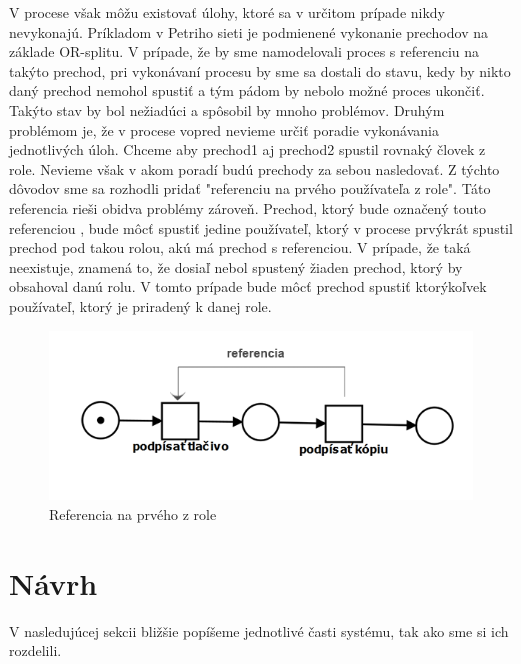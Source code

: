 V procese však môžu existovať úlohy, ktoré sa v určitom prípade nikdy nevykonajú. Príkladom v Petriho sieti je podmienené vykonanie prechodov na základe OR-splitu. V prípade, že by sme namodelovali proces s referenciu na takýto prechod, pri vykonávaní procesu by sme sa dostali do stavu, kedy by nikto daný prechod nemohol spustiť a tým pádom by nebolo možné proces ukončiť. Takýto stav by bol nežiadúci a spôsobil by mnoho problémov. Druhým problémom je, že v procese vopred nevieme určiť poradie vykonávania jednotlivých úloh. Chceme aby prechod1 aj prechod2 spustil rovnaký človek z role. Nevieme však v akom poradí budú prechody za sebou nasledovať. Z týchto dôvodov sme sa rozhodli pridať "referenciu na prvého používateľa z role". Táto referencia rieši obidva problémy zároveň. Prechod, ktorý bude označený touto referenciou , bude môcť spustiť jedine používateľ, ktorý v procese prvýkrát spustil prechod pod takou rolou, akú má prechod s referenciou. V prípade, že taká neexistuje, znamená to, že dosiaľ nebol spustený žiaden prechod, ktorý by obsahoval danú rolu. V tomto prípade bude môcť prechod spustiť ktorýkoľvek používateľ, ktorý je priradený k danej role.

\begin{figure}[h]
	\centering
	\includegraphics[width=0.7\linewidth]{images/referencia}
	\caption{Referencia na prvého z role}
	\label{fig:referencia na prvého z role}
\end{figure}




\section{Návrh}
V nasledujúcej sekcii bližšie popíšeme jednotlivé časti systému, tak ako sme si ich rozdelili.

